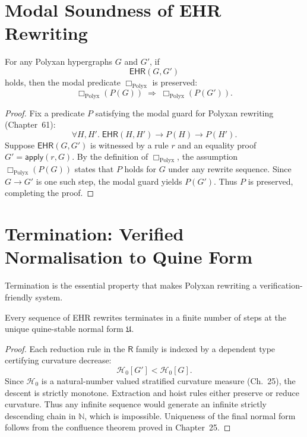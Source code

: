 \section{Modal Soundness of EHR Rewriting}

\begin{theorem}
\label{thm:67-sound}
For any Polyxan hypergraphs $G$ and $G'$, if
\[
\mathsf{EHR}(G,G')
\]
holds, then the modal predicate $\Box_{\mathrm{Polyx}}$ is preserved:
\[
\Box_{\mathrm{Polyx}}(P(G)) \;\Longrightarrow\; \Box_{\mathrm{Polyx}}(P(G')).
\]
\end{theorem}

\begin{proof}
Fix a predicate $P$ satisfying the modal guard for Polyxan rewriting 
(Chapter~61):
\[
\forall H,H'.\; \mathsf{EHR}(H,H') \to P(H) \to P(H').
\]
Suppose $\mathsf{EHR}(G,G')$ is witnessed by a rule $r$ and an equality proof 
$G'=\mathsf{apply}(r,G)$.  
By the definition of $\Box_{\mathrm{Polyx}}$, the assumption 
$\Box_{\mathrm{Polyx}}(P(G))$ states that $P$ holds for $G$ under any 
rewrite sequence.  
Since $G \to G'$ is one such step, the modal guard yields $P(G')$.  
Thus $P$ is preserved, completing the proof.
\end{proof}

\section{Termination: Verified Normalisation to Quine Form}

Termination is the essential property that makes Polyxan rewriting 
a verification-friendly system.

\begin{theorem}
\label{thm:67-termination}
Every sequence of EHR rewrites terminates in a finite number of steps at the 
unique quine-stable normal form $\mathfrak{U}$.
\end{theorem}

\begin{proof}
Each reduction rule in the $\mathsf{R}$ family is indexed by a dependent type 
certifying curvature decrease:
\[
\mathcal{H}_0[G'] < \mathcal{H}_0[G].
\]
Since $\mathcal{H}_0$ is a natural-number valued stratified curvature measure 
(Ch.~25), the descent is strictly monotone.  
Extraction and hoist rules either preserve or reduce curvature.  
Thus any infinite sequence would generate an infinite strictly descending chain 
in $\mathbb{N}$, which is impossible.  
Uniqueness of the final normal form follows from the confluence theorem proved 
in Chapter~25.
\end{proof}

